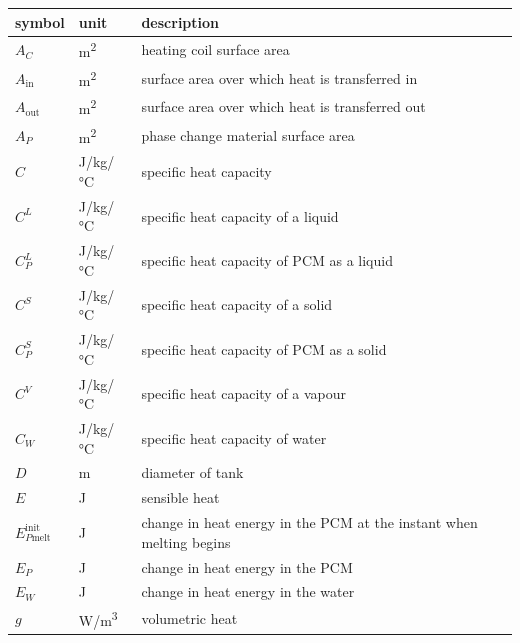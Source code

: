 \documentclass[12pt]{article}
\begin{document}
\renewcommand{\arraystretch}{1.2}
\noindent \begin{longtable*}{l l p{12cm}} \toprule
  \textbf{symbol} & \textbf{unit} & \textbf{description}\\
  \midrule $A_C$ & \si[per-mode=symbol] {\square\metre} & heating coil surface
  area
  \\
  $A_\text{in}$ & \si[per-mode=symbol] {\square\metre} & surface area over which
  heat is transferred in
  \\
  $A_\text{out}$ & \si[per-mode=symbol] {\square\metre} & surface area over
  which heat is transferred out
  \\
  $A_P$ & \si[per-mode=symbol] {\square\metre} & phase change material surface
  area
  \\
  $C$ & \si[per-mode=symbol] {\joule\per \kilogram\per \celsius} & specific heat
  capacity
  \\
  $C^L$ & \si[per-mode=symbol] {\joule\per\kilo\gram\per\celsius} & specific
  heat capacity of a liquid
  \\
  $C^L_P$ & \si[per-mode=symbol] {\joule\per \kilogram\per \celsius} & specific
  heat capacity of PCM as a liquid
  \\
  $C^S$ & \si[per-mode=symbol] {\joule\per\kilo\gram\per\celsius} & specific
  heat capacity of a solid
  \\
  $C^S_P$ & \si[per-mode=symbol] {\joule\per \kilogram\per \celsius} & specific
  heat capacity of PCM as a solid
  \\
  $C^V$ & \si[per-mode=symbol] {\joule\per \kilogram\per \celsius} & specific
  heat capacity of a vapour
  \\
  $C_W$ & \si[per-mode=symbol] {\joule\per \kilogram\per \celsius} & specific
  heat capacity of water
  \\
  $D$ & \si{\metre} & diameter of tank
  \\
  $E$ & \si[per-mode=symbol] {\joule} & sensible heat
  \\
  $E_{P\text{melt}}^\text{init}$ & \si[per-mode=symbol] {\joule} & change in
  heat energy in the PCM at the instant when melting begins
  \\
  $E_P$ & \si[per-mode=symbol] {\joule} & change in heat energy in the PCM
  \\
  $E_W$ & \si[per-mode=symbol] {\joule} & change in heat energy in the water
  \\
  $g$ & \si[per-mode=symbol] {\watt\per\cubic\metre} & volumetric heat

\end{longtable*}
\end{document}
